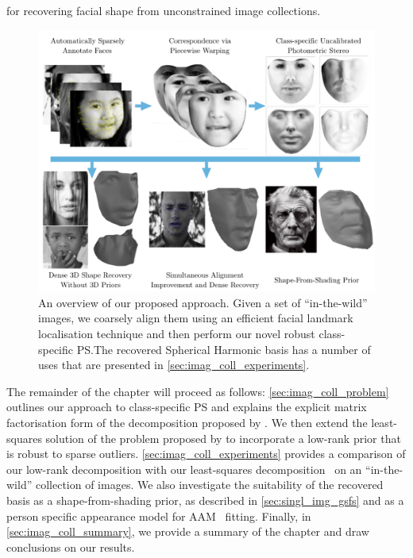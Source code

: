 for recovering facial shape from unconstrained image collections.
\begin{figure}[t]
    \centering
    \includegraphics[width=15cm]{collection_ps/images/algorithm_overview}
    \caption{An overview of our proposed approach. Given a set of
             ``in-the-wild'' images, we coarsely align them using an efficient
             facial landmark localisation technique and then perform our
             novel robust class-specific PS.\@ The recovered Spherical Harmonic
             basis has a number of uses that are presented in
             \cref{sec:imag_coll_experiments}.}
\label{fig:imag_coll_overview}
\end{figure}

The remainder of the chapter will proceed as follows: \cref{sec:imag_coll_problem}
outlines our approach to class-specific PS and explains the explicit matrix
factorisation form of the decomposition proposed by
\citet{KemelmacherShlizerman:2013iv}. We then extend the least-squares
solution of the problem proposed by \citet{KemelmacherShlizerman:2013iv} to
incorporate a low-rank prior that is robust to sparse outliers.
\cref{sec:imag_coll_experiments} provides a comparison of our low-rank
decomposition with our least-squares decomposition~\cite{KemelmacherShlizerman:2013iv}
on an ``in-the-wild'' collection of images. We also investigate the suitability
of the recovered basis as a shape-from-shading prior, as described in
\cref{sec:singl_img_gsfs} and as a person specific appearance model for
AAM~\cite{cootes2001active} fitting. Finally, in \cref{sec:imag_coll_summary},
we provide a summary of the chapter and draw conclusions on our results.



\stopcontents[chapters]
